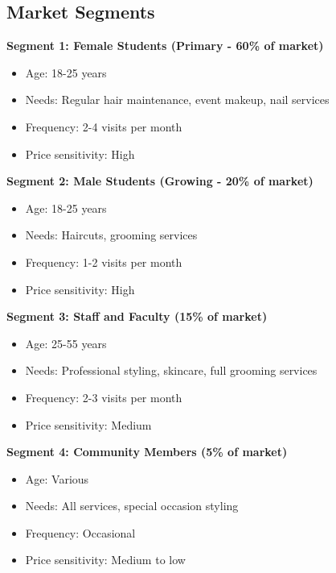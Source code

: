 \subsection{Market Segments}

\textbf{Segment 1: Female Students (Primary - 60\% of market)}
\begin{itemize}[leftmargin=2em]
    \item Age: 18-25 years
    \item Needs: Regular hair maintenance, event makeup, nail services
    \item Frequency: 2-4 visits per month
    \item Price sensitivity: High
\end{itemize}

\textbf{Segment 2: Male Students (Growing - 20\% of market)}
\begin{itemize}[leftmargin=2em]
    \item Age: 18-25 years
    \item Needs: Haircuts, grooming services
    \item Frequency: 1-2 visits per month
    \item Price sensitivity: High
\end{itemize}

\textbf{Segment 3: Staff and Faculty (15\% of market)}
\begin{itemize}[leftmargin=2em]
    \item Age: 25-55 years
    \item Needs: Professional styling, skincare, full grooming services
    \item Frequency: 2-3 visits per month
    \item Price sensitivity: Medium
\end{itemize}

\textbf{Segment 4: Community Members (5\% of market)}
\begin{itemize}[leftmargin=2em]
    \item Age: Various
    \item Needs: All services, special occasion styling
    \item Frequency: Occasional
    \item Price sensitivity: Medium to low
\end{itemize}

\vspace{1em}

